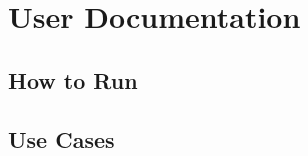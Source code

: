 \chapter{User Documentation}
\label{chap:user-documentation}


\section{How to Run}
\label{sec:how-to-run}


\section{Use Cases}
\label{sec:use-cases}

